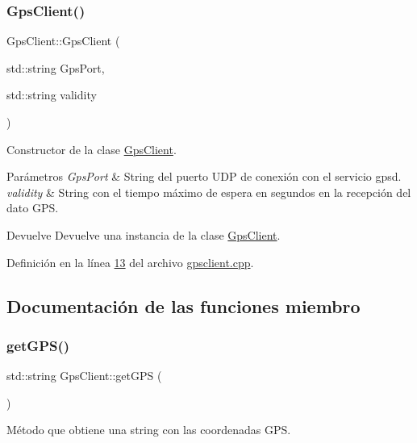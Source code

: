 \subsubsection{\texorpdfstring{Gps\+Client()}{GpsClient()}}
{\footnotesize\ttfamily Gps\+Client\+::\+Gps\+Client (\begin{DoxyParamCaption}\item[{std\+::string}]{Gps\+Port,  }\item[{std\+::string}]{validity }\end{DoxyParamCaption})}



Constructor de la clase \hyperlink{classGpsClient}{Gps\+Client}. 


\begin{DoxyParams}{Parámetros}
{\em Gps\+Port} & String del puerto U\+DP de conexión con el servicio gpsd. \\
\hline
{\em validity} & String con el tiempo máximo de espera en segundos en la recepción del dato G\+PS. \\
\hline
\end{DoxyParams}
\begin{DoxyReturn}{Devuelve}
Devuelve una instancia de la clase \hyperlink{classGpsClient}{Gps\+Client}. 
\end{DoxyReturn}


Definición en la línea \hyperlink{gpsclient_8cpp_source_l00013}{13} del archivo \hyperlink{gpsclient_8cpp_source}{gpsclient.\+cpp}.



\subsection{Documentación de las funciones miembro}
\mbox{\label{classGpsClient_ace715e2b156d90e8d0b6cd1a91da4807}} 
\subsubsection{\texorpdfstring{get\+G\+P\+S()}{getGPS()}}
{\footnotesize\ttfamily std\+::string Gps\+Client\+::get\+G\+PS (\begin{DoxyParamCaption}{ }\end{DoxyParamCaption})}



Método que obtiene una string con las coordenadas G\+PS. 

